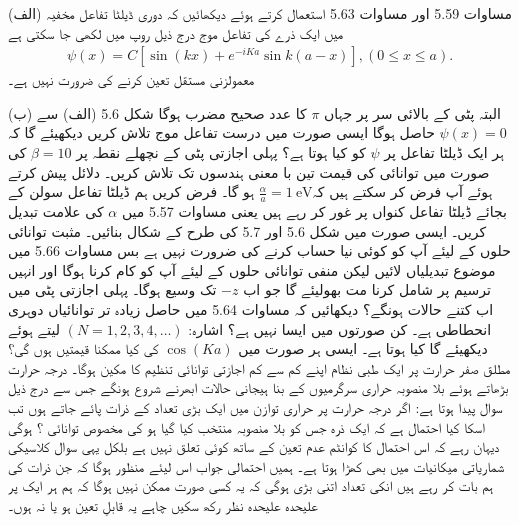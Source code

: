 

(الف) مساوات \num{5.59} اور مساوات \num{5.63} استعمال کرتے ہوئے دیکھائیں کہ دوری ڈیلٹا تفاعل مخفیہ میں ایک ذرے کی تفاعل موج درج ذیل روپ میں لکھی جا سکتی ہے 
\begin{align*}
	\psi(x) = C[\sin(kx)+e^{-iKa}\sin k(a-x)], (0\leq x\leq a).
\end{align*} 
معمولزنی مستقل  تعین کرنے کی ضرورت نہیں ہے۔

(ب)  البتہ پٹی کے بالائی سر پر جہاں  $\pi$ کا عدد صحیح مضرب ہوگا شکل \num{5.6} (الف) سے \(\psi(x) = 0\) حاصل ہوگا ایسی صورت میں درست تفاعل موج تلاش کریں دیکھیئے گا کہ ہر ایک ڈیلٹا تفاعل پر \(\psi\) کو کیا ہوتا ہے؟
پہلی اجازتی پٹی کے نچھلے نقطہ پر \(\beta = 10\) کی صورت میں توانائی کی قیمت تین با معنی ہندسوں تک تلاش کریں۔ دلائل پیش کرتے ہوئے آپ فرض کر سکتے ہیں کہ\(\frac{\alpha}{a} = \SI{1}{\electronvolt}\) ہو گا۔
فرض کریں ہم ڈیلٹا تفاعل سولن کے بجائے ڈیلٹا تفاعل کنواں پر غور کر رہے ہیں یعنی مساوات \num{5.57} میں \(\alpha\) کی علامت تبدیل کریں۔ ایسی صورت میں شکل \num{5.6} اور \num{5.7} کی طرح کے شکال بنائیں۔ مثبت توانائی حلوں کے لیئے آپ کو کوئی نیا حساب کرنے کی ضرورت نہیں ہے بس مساوات \num{5.66} میں موضوع تبدیلیاں لائیں لیکن منفی توانائی حلوں کے لیئے آپ کو کام کرنا ہوگا اور انہیں ترسیم پر شامل کرنا مت بھولیئے گا جو اب \(-z\) تک وسیع ہوگا۔ پہلی اجازتی پٹی میں اب کتنے حالات ہونگے؟
دیکھائیں کہ مساوات \num{5.64} میں حاصل زیادہ تر توانائیاں دوہری انحطاطی ہے۔ کن صورتوں میں ایسا نہیں ہے؟ اشارہ: \((N=1, 2, 3, 4, \dots)\) لیتے ہوئے دیکھیئے گا کیا ہوتا ہے۔ ایسی ہر صورت میں \(\cos(Ka)\) کی کیا ممکنا قیمتیں ہوں گی؟
مطلق صفر حرارت پر ایک طبی نظام اپنے کم سے کم اجازتی توانائی تنظیم کا مکین ہوگا۔ درجہ حرارت بڑھاتے ہوئے بلا منصوبہ حراری سرگرمیوں کے بنا ہیجانی حالات ابھرنے شروع ہونگے جس سے درج ذیل سوال پیدا ہوتا ہے: اگر  درجہ حرارت پر حراری توازن میں ایک بڑی تعداد  کے ذرات پائے جاتے ہوں تب اسکا کیا احتمال ہے کہ ایک ذرہ جس کو بلا منصوبہ منتخب کیا گیا ہو کی مخصوص توانائی ؟ ہوگی دیہان رہے کہ اس احتمال کا کوانٹم عدم تعین کے ساتھ کوئی تعلق نہیں ہے بلکل یہی سوال کلاسیکی شماریاتی میکانیات میں بھی کھڑا ہوتا ہے۔ ہمیں احتمالی جواب اس لیئے منظور ہوگا کہ جن ذرات کی ہم بات کر رہے ہیں انکی تعداد اتنی بڑی ہوگی کہ یہ کسی صورت ممکن نہیں ہوگا کہ ہم ہر ایک پر علیحدہ علیحدہ نظر رکھ سکیں چاہے یہ قابلِ تعین ہو یا نہ ہوں۔

